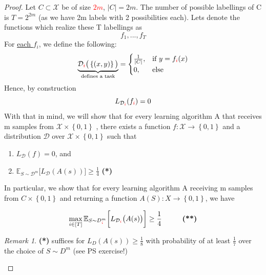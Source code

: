 \documentclass[10pt,a4paper]{article}
\theoremstyle{remark}
\newtheorem*{remark}{Remark}
\theoremstyle{definition}
\theoremstyle{plain}
\begin{document}
\begin{proof}
	Let $C \subset \mathcal{X}$ be of size \textcolor{red}{$2m$}, $|C| = 2m$. The number of possible labellings of C is  $T = 2^{2m}$ (as we have 2m labels with 2 possibilities each). Lets denote the functions which realize these T labellings as 
	$$ f_1 , ..., f_T $$
	For \underline{each $f_i$}, we define the following:
	\begin{align*}
		\underbrace{\mathcal{D}_{\textcolor{red}{i}}\big(\left\{(x,y)\right\}\big)}_{\text{defines a task}} = \begin{cases}
				\frac{1}{|C|} , &  \text{if $y = f_{\textcolor{red}{i}}(x)$}\\
				0 , &   \text{else} 
		\end{cases}
	\end{align*}
	Hence, by construction 
	$$
		L_{\mathcal{D}_{\textcolor{red}{i}}}(f_{\textcolor{red}{i}}) = 0
	$$
	With that in mind, we will show that for every learning algorithm A that receives m samples from $\mathcal{X} \times \left\{0,1\right\}$ , there exists a function $f: \mathcal{X} \to \left\{0,1\right\}$ and a distribution $\mathcal{D}$ over $\mathcal{X} \times \left\{0,1\right\}$ such that

		\begin{enumerate}

			\item $L_\mathcal{D}(f) = 0$, and
			\item $\mathbb{E}_{S \sim \mathcal{D}^m}\big[L_\mathcal{D}(A(s))\big] \geq \frac{1}{4}$ \hspace{1cm} \textbf{(*)}
		\end{enumerate}	
	In particular, we show that for every learning algorithm A receiving m samples from $C \times \left\{0,1\right\}$ and returning a function $A(S): X \to \left\{0,1\right\}$, we have
	
	$$
		\max_{i \in [T]} \mathbb{E}_{S \sim D^{m}_{\textcolor{red}{i}}}\bigg[L_{\mathcal{D}_{\textcolor{red}{i}}}\big(A(s)\big)\bigg] \geq \frac{1}{4} \hspace{1cm} \text{\textbf{(**)}}
	$$
	\begin{remark}
		\textbf{(*)} suffices for $L_D(A(s)) \geq \frac{1}{8}$ with probability of at least $\frac{1}{7}$ over the choice of $S \sim D^m$ (see PS exercise!)
	\end{remark}
	

\end{proof}
\end{document}
